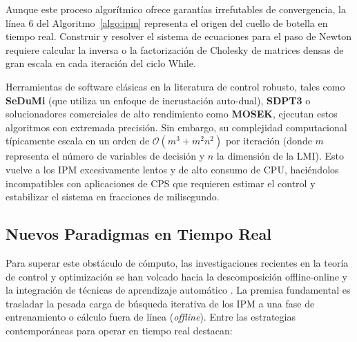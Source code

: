 Aunque este proceso algorítmico ofrece garantías irrefutables de convergencia, la línea 6 del Algoritmo~\ref{algo:ipm} representa el origen del cuello de botella en tiempo real. Construir y resolver el sistema de ecuaciones para el paso de Newton requiere calcular la inversa o la factorización de Cholesky de matrices densas de gran escala en cada iteración del ciclo While. 

Herramientas de software clásicas en la literatura de control robusto, tales como \textbf{SeDuMi} (que utiliza un enfoque de incrustación auto-dual), \textbf{SDPT3} o solucionadores comerciales de alto rendimiento como \textbf{MOSEK}, ejecutan estos algoritmos con extremada precisión. Sin embargo, su complejidad computacional típicamente escala en un orden de $\mathcal{O}(m^3 + m^2 n^2)$ por iteración (donde $m$ representa el número de variables de decisión y $n$ la dimensión de la LMI). Esto vuelve a los IPM excesivamente lentos y de alto consumo de CPU, haciéndolos incompatibles con aplicaciones de CPS que requieren estimar el control y estabilizar el sistema en fracciones de milisegundo.

\subsection{Nuevos Paradigmas en Tiempo Real}

Para superar este obstáculo de cómputo, las investigaciones recientes en la teoría de control y optimización se han volcado hacia la descomposición offline-online y la integración de técnicas de aprendizaje automático \cite{sambharya2023end, grontas2026pinet, tordesillas2023rayen, min2024hardnet}. La premisa fundamental es trasladar la pesada carga de búsqueda iterativa de los IPM a una fase de entrenamiento o cálculo fuera de línea (\textit{offline}). Entre las estrategias contemporáneas para operar en tiempo real destacan:

